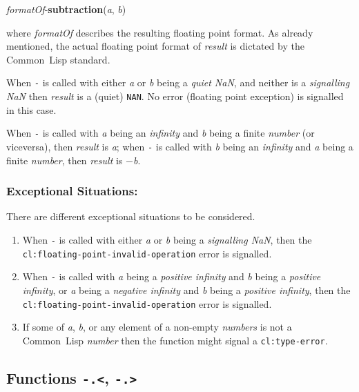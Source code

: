 \documentclass[10pt,fleqn]{article}
\newcommand{\CL}{\textsf{Common~Lisp}}
\newcommand{\code}[1]{\texttt{#1}}
\newcommand{\clieeeterm}[1]{\textit{#1}}
\newcommand{\varname}[1]{\textit{#1}}
\newcommand{\clterm}[1]{\textit{#1}}
\newcommand{\clname}[1]{\texttt{#1}}
\newcommand{\DDictionaryItem}[1]{\vspace*{6pt}\noindent\hrulefill\vspace*{-9pt}\subsection*{#1}}
\newcommand{\DExceptional}{\subsubsection*{Exceptional Situations:}}
\begin{document}
\noindent
\textit{formatOf}-\textbf{subtraction}(\varname{a}, \varname{b})

\vspace*{3mm}

\noindent
where \textit{formatOf} describes the resulting floating point
format.  As already mentioned, the actual floating point format of
\varname{result} is dictated by the \CL{} standard.

When \code{-} is called with either \varname{a} or \varname{b} being a
\emph{quiet NaN}, and neither is a \emph{signalling NaN} then
\varname{result} is a (quiet) \code{NAN}.  No error (floating point
exception) is signalled in this case.

When \code{-} is called with \varname{a} being an 
\clieeeterm{infinity} and \varname{b} being a finite \clterm{number}
(or viceversa), then \varname{result} is \varname{a}; when \code{-} is
called with \varname{b} being an \clieeeterm{infinity} and \varname{a}
being a finite \clterm{number}, then \varname{result}
is $-$\varname{b}.


\DExceptional{}

There are different exceptional situations to be considered.

\begin{enumerate}
\item When \code{-} is called with either \varname{a} or \varname{b}
  being a \emph{signalling NaN}, then the\\
  \clname{cl:floating-point-invalid-operation} error is signalled.

\item When \code{-} is called with \varname{a} being a
  \clieeeterm{positive infinity} and \varname{b} being a
  \clieeeterm{positive infinity}, or \varname{a} being a
  \clieeeterm{negative infinity} and \varname{b} being a
  \clieeeterm{positive infinity}, then the\\
  \clname{cl:floating-point-invalid-operation} error is signalled.

\item If some of \varname{a}, \varname{b}, or any element of a non-empty
  \varname{numbers} is not a \CL{} \clterm{number} then the function
  might signal a \clname{cl:type-error}.
\end{enumerate}


\DDictionaryItem{Functions \code{-.<}, \code{-.>}}
\index{*!\code{-.<}}
\index{*!\code{-.>}}
\end{document}
